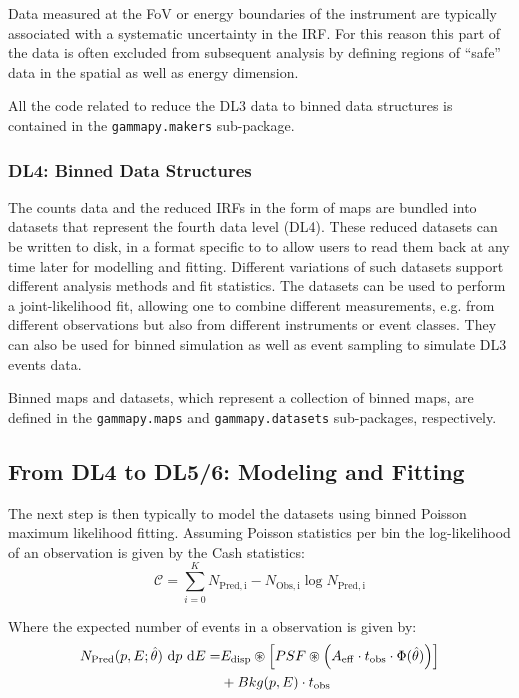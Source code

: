 \documentclass[longauth]{aa}
\newcommand{\code}[1]{\texttt{#1}}
\begin{document}
Data measured at the FoV or energy boundaries of the instrument are typically
associated with a systematic uncertainty in the IRF. For this reason this part 
of the data is often excluded from subsequent analysis by defining regions of
\enquote{safe} data in the spatial as well as energy dimension.

All the code related to reduce the DL3 data to binned data structures 
is contained in the \code{gammapy.makers} sub-package.


 \subsubsection{DL4: Binned Data Structures}
 The counts data and the reduced IRFs in the form of maps are bundled into datasets
 that represent the fourth data level (DL4). These reduced datasets can be written to disk,
 in a format specific to \gammapy to allow users to read them back at any time later
 for modelling and fitting. Different variations of such datasets support different 
 analysis methods and fit statistics. The datasets can be used to perform a joint-likelihood
 fit, allowing one to combine different measurements, e.g. from different observations
 but also from different instruments or event classes. They can also be used for binned
 simulation as well as event sampling to simulate DL3 events data.


Binned maps and datasets, which represent a collection of binned
maps, are defined in the \code{gammapy.maps} and \code{gammapy.datasets}
sub-packages, respectively. 


\subsection{From DL4 to DL5/6: Modeling and Fitting}
The next step is then typically to model the datasets using binned Poisson maximum likelihood fitting.
Assuming Poisson statistics per bin the log-likelihood of an observation is given by the Cash statistics\citep{Cash}:
%
\begin{equation}
	\mathcal{C} = \sum_{i=0}^K N_{\mathrm{Pred, i}} - N_{\mathrm{Obs, i}} \log{N_{\mathrm{Pred, i}}} 
\end{equation}

Where the expected number of events in a \gammaray observation is given by:
 \begin{equation}
	 \begin{split}
		N_{\mathrm{Pred}}(p, E; \hat{\theta})\ {\rm d}p\ {\rm d}E =  &E_{\rm disp} \circledast \left[ PSF \circledast \left( A_{\rm eff} \cdot t_{\rm obs} \cdot \Phi(\hat{\theta}) \right) \right]\\
						& + Bkg(p, E) \cdot t_{\rm obs}
	 \end{split}
 \end{equation}
\end{document}

